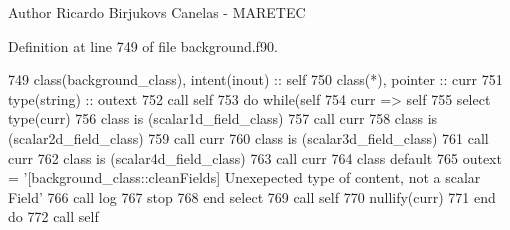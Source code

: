 \begin{DoxyAuthor}{Author}
Ricardo Birjukovs Canelas -\/ M\+A\+R\+E\+T\+EC 
\end{DoxyAuthor}


Definition at line 749 of file background.\+f90.


\begin{DoxyCode}
749     \textcolor{keywordtype}{class}(background\_class), \textcolor{keywordtype}{intent(inout)} :: self
750     \textcolor{keywordtype}{class}(*), \textcolor{keywordtype}{pointer} :: curr
751     \textcolor{keywordtype}{type}(string) :: outext
752     \textcolor{keyword}{call }self%
753     \textcolor{keywordflow}{do} \textcolor{keywordflow}{while}(self%
754         curr => self%
755         \textcolor{keywordflow}{select type}(curr)
756 \textcolor{keywordflow}{        class is} (scalar1d\_field\_class)
757             \textcolor{keyword}{call }curr%
758 \textcolor{keywordflow}{        class is} (scalar2d\_field\_class)
759             \textcolor{keyword}{call }curr%
760 \textcolor{keywordflow}{        class is} (scalar3d\_field\_class)
761             \textcolor{keyword}{call }curr%
762 \textcolor{keywordflow}{        class is} (scalar4d\_field\_class)
763             \textcolor{keyword}{call }curr%
764 \textcolor{keywordflow}{            class default}
765             outext = \textcolor{stringliteral}{'[background\_class::cleanFields] Unexepected type of content, not a scalar Field'}
766             \textcolor{keyword}{call }log%
767             stop
768 \textcolor{keywordflow}{        end select}
769         \textcolor{keyword}{call }self%
770         \textcolor{keyword}{nullify}(curr)
771 \textcolor{keywordflow}{    end do}
772     \textcolor{keyword}{call }self%
\end{DoxyCode}
\mbox{\label{namespacebackground__mod_ad0096fb6a5a11854fd70a7ce58dc3000}} 
